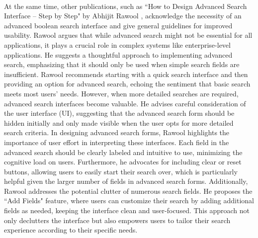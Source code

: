 \paragraph{} At the same time, other publications, such as ``How to Design Advanced Search Interface – Step by Step" by Abhijit Rawool \cite{RawoolAdvancedSearch}, acknowledge the necessity of an advanced boolean search interface and give general guidelines for improved usability. Rawool argues that while advanced search might not be essential for all applications, it plays a crucial role in complex systems like enterprise-level applications. He suggests a thoughtful approach to implementing advanced search, emphasizing that it should only be used when simple search fields are insufficient. Rawool recommends starting with a quick search interface and then providing an option for advanced search, echoing the sentiment that basic search meets most users' needs. However, when more detailed searches are required, advanced search interfaces become valuable. He advises careful consideration of the user interface (UI), suggesting that the advanced search form should be hidden initially and only made visible when the user opts for more detailed search criteria. In designing advanced search forms, Rawool highlights the importance of user effort in interpreting these interfaces. Each field in the advanced search should be clearly labeled and intuitive to use, minimizing the cognitive load on users. Furthermore, he advocates for including clear or reset buttons, allowing users to easily start their search over, which is particularly helpful given the larger number of fields in advanced search forms. Additionally, Rawool addresses the potential clutter of numerous search fields. He proposes the ``Add Fields" feature, where users can customize their search by adding additional fields as needed, keeping the interface clean and user-focused. This approach not only declutters the interface but also empowers users to tailor their search experience according to their specific needs.

